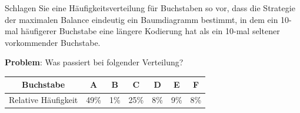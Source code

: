 \begin{mychallenge}
	Schlagen Sie eine Häufigkeitsverteilung für Buchstaben so vor, dass die Strategie der maximalen Balance eindeutig ein Baumdiagramm bestimmt, in dem ein 10-mal häufigerer Buchstabe eine längere Kodierung hat als ein 10-mal seltener vorkommender Buchstabe.
\end{mychallenge}

\begin{myexercise}
	\textbf{Problem}: Was passiert bei folgender Verteilung?
	\begin{table}[H]
		\centering
		\begin{tabular}{c|c|c|c|c|c|c}
			\textbf{Buchstabe}  & \textbf{A} & \textbf{B} & \textbf{C} & \textbf{D} & \textbf{E} & \textbf{F} \\\midrule\midrule
			Relative Häufigkeit & 49\%       & 1\%        & 25\%       & 8\%        & 9\%        & 8\%
		\end{tabular}
	\end{table}


	\begin{myanswer}
		\begin{figure}[H]
			\centering
\end{figure}
\end{myanswer}
\end{myexercise}
